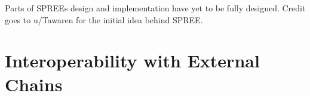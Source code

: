 Parts of SPREEs design and implementation have yet to be fully designed. Credit goes to u/Tawaren for the initial idea behind SPREE.
\section{Interoperability with External Chains}\label{sec:bridge}
